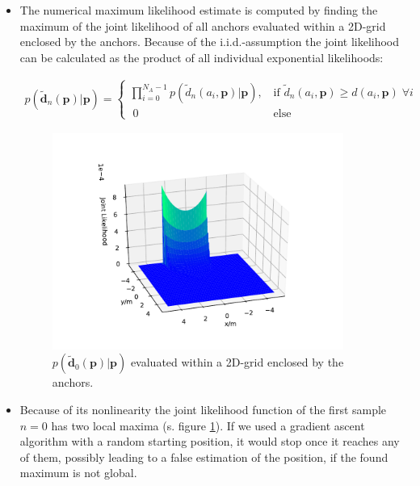 \documentclass{article}
\begin{document}
\begin{itemize}
\item The numerical maximum likelihood estimate is computed by finding the maximum of the joint likelihood of all anchors evaluated within a 2D-grid enclosed by the anchors. Because of the i.i.d.-assumption the joint likelihood can be calculated as the product of all individual exponential likelihoods:

\begin{align*}
p(\mathbf{\tilde{d}}_n(\mathbf{p})|\mathbf{p}) = 
\begin{cases}
\displaystyle \prod_{i=0}^{N_A-1} p(\tilde{d}_n(a_i,\mathbf{p})|\mathbf{p})\text{,}	& 	\; \text{if } \tilde{d}_n(a_i,\mathbf{p}) \geq d (a_i,\mathbf{p}) \; \forall i \\
\; 0 	&	\; \text{else}
\end{cases}
\end{align*} 

\begin{figure}[h]
\centering
\includegraphics[width=0.9\textwidth]{./Figures/scenario3_grid_nml.pdf}
\caption{$p(\mathbf{\tilde{d}}_0(\mathbf{p})|\mathbf{p})$ evaluated within a 2D-grid enclosed by the anchors.}
\label{fig:scenario3_grid_nml}
\end{figure}

\item Because of its nonlinearity the joint likelihood function of the first sample $n=0$ has two local maxima (s. figure \ref{fig:scenario3_grid_nml}). If we used a gradient ascent algorithm with a random starting position, it would stop once it reaches any of them, possibly leading to a false estimation of the position, if the found maximum is not global.\\


\end{itemize}
\end{document}
